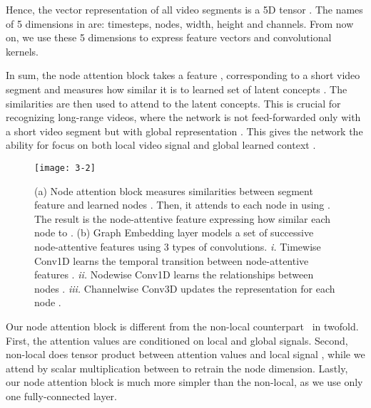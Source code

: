 \documentclass[10pt,twocolumn,letterpaper]{article}
\begin{document}
Hence, the vector representation of all video segments is a 5D tensor . The names of 5 dimensions in  are: timesteps, nodes, width, height and channels.
From now on, we use these 5 dimensions to express feature vectors and convolutional kernels.

In sum, the node attention block takes a feature , corresponding to a short video segment  and measures how similar  it is to learned set of latent concepts .
The similarities  are then used to attend to the latent concepts.
This is crucial for recognizing long-range videos, where the network is not feed-forwarded only with a short video segment  but with global representation .
This gives the network the ability for focus on both local video signal  and global learned context .

\begin{figure}[!ht]
\begin{center}
\texttt{[image: 3-2]}
\end{center}
\caption{(a) Node attention block measures similarities  between segment feature  and learned nodes .
Then, it attends to each node in  using . The result is the node-attentive feature  expressing how similar each node to .
(b) Graph Embedding layer models a set of  successive node-attentive features  using 3 types of convolutions.
\textit{i.} Timewise Conv1D learns the temporal transition between node-attentive features .
\textit{ii.} Nodewise Conv1D learns the relationships between nodes .
\textit{iii.} Channelwise Conv3D updates the representation for each node .}
\label{fig:3-2}
\end{figure}

Our node attention block is different from the non-local counterpart~\cite{wang2017non} in twofold.
First, the attention values are conditioned on local  and global  signals.
Second, non-local does tensor product between attention values  and local signal , while we attend by scalar multiplication between  to retrain the node dimension. Lastly, our node attention block is much more simpler than the non-local, as we use only one fully-connected layer.
\end{document}

